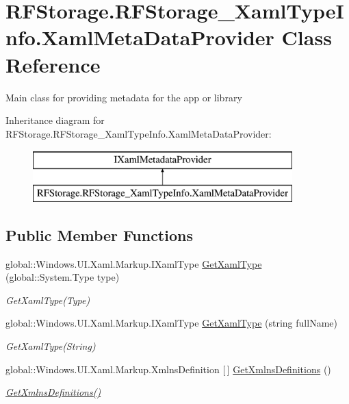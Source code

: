 \hypertarget{class_r_f_storage_1_1_r_f_storage___xaml_type_info_1_1_xaml_meta_data_provider}{}\section{R\+F\+Storage.\+R\+F\+Storage\+\_\+\+Xaml\+Type\+Info.\+Xaml\+Meta\+Data\+Provider Class Reference}
\label{class_r_f_storage_1_1_r_f_storage___xaml_type_info_1_1_xaml_meta_data_provider}


Main class for providing metadata for the app or library  


Inheritance diagram for R\+F\+Storage.\+R\+F\+Storage\+\_\+\+Xaml\+Type\+Info.\+Xaml\+Meta\+Data\+Provider\+:\begin{figure}[H]
\begin{center}
\leavevmode
\includegraphics[height=2.000000cm]{class_r_f_storage_1_1_r_f_storage___xaml_type_info_1_1_xaml_meta_data_provider}
\end{center}
\end{figure}
\subsection*{Public Member Functions}
\begin{DoxyCompactItemize}
\item 
global\+::\+Windows.\+U\+I.\+Xaml.\+Markup.\+I\+Xaml\+Type \mbox{\hyperlink{class_r_f_storage_1_1_r_f_storage___xaml_type_info_1_1_xaml_meta_data_provider_a410e252137ad4ce4d60af87bb5822e99}{Get\+Xaml\+Type}} (global\+::\+System.\+Type type)
\begin{DoxyCompactList}\small\item\em Get\+Xaml\+Type(\+Type) \end{DoxyCompactList}\item 
global\+::\+Windows.\+U\+I.\+Xaml.\+Markup.\+I\+Xaml\+Type \mbox{\hyperlink{class_r_f_storage_1_1_r_f_storage___xaml_type_info_1_1_xaml_meta_data_provider_a7da5c0ed8abaaaa09d46e91b9fb1fc65}{Get\+Xaml\+Type}} (string full\+Name)
\begin{DoxyCompactList}\small\item\em Get\+Xaml\+Type(\+String) \end{DoxyCompactList}\item 
global\+::\+Windows.\+U\+I.\+Xaml.\+Markup.\+Xmlns\+Definition \mbox{[}$\,$\mbox{]} \mbox{\hyperlink{class_r_f_storage_1_1_r_f_storage___xaml_type_info_1_1_xaml_meta_data_provider_a53c3df7eda4ba7894e70994c690fc945}{Get\+Xmlns\+Definitions}} ()
\begin{DoxyCompactList}\small\item\em \mbox{\hyperlink{class_r_f_storage_1_1_r_f_storage___xaml_type_info_1_1_xaml_meta_data_provider_a53c3df7eda4ba7894e70994c690fc945}{Get\+Xmlns\+Definitions()}} \end{DoxyCompactList}\end{DoxyCompactItemize}


